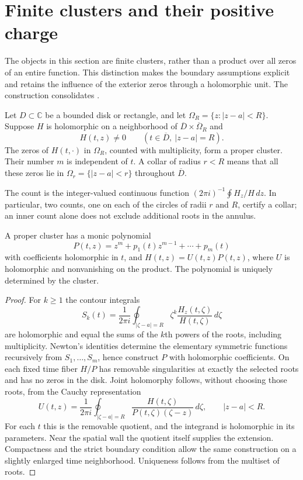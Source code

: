\section{Finite clusters and their positive charge}\label{f:cluster-section}

The objects in this section are finite clusters, rather than a product
over all zeros of an entire function.  This distinction makes the
boundary assumptions explicit and retains the influence of the exterior
zeros through a holomorphic unit.  The construction consolidates
\cite{note04}.

\begin{definition}\label{f:proper}
Let $D\subset\mathbb C$ be a bounded disk or rectangle, and let
$\Omega_R=\{z:|z-a|<R\}$.  Suppose $H$ is holomorphic on a neighborhood
of $\overline D\times\overline\Omega_R$ and
\[
 H(t,z)\ne0\qquad
 (t\in\overline D,\ |z-a|=R).
\]
The zeros of $H(t,\cdot)$ in $\Omega_R$, counted with multiplicity,
form a proper cluster.  Their number $m$ is independent of $t$.
A collar of radius $r<R$ means that all these zeros lie in
$\Omega_r=\{|z-a|<r\}$ throughout $\overline D$.
\end{definition}

The count is the integer-valued continuous function
$(2\pi i)^{-1}\oint H_z/H\,dz$.  In particular, two counts, one on each
of the circles of radii $r$ and $R$, certify a collar; an inner count
alone does not exclude additional roots in the annulus.

\begin{lemma}\label{f:preparation}\label{f:cluster}
A proper cluster has a monic polynomial
\[
 P(t,z)=z^m+p_1(t)z^{m-1}+\cdots+p_m(t)
\]
with coefficients holomorphic in $t$, and
$H(t,z)=U(t,z)P(t,z)$, where $U$ is holomorphic and nonvanishing on
the product.  The polynomial is uniquely determined by the cluster.
\end{lemma}

\begin{proof}
For $k\ge1$ the contour integrals
\begin{equation}\label{f:root-moments}
 S_k(t)=\frac1{2\pi i}\oint_{|\zeta-a|=R}
       \zeta^k\frac{H_z(t,\zeta)}{H(t,\zeta)}\,d\zeta
\end{equation}
are holomorphic and equal the sums of the $k$th powers of the roots,
including multiplicity.  Newton's identities determine the elementary
symmetric functions recursively from $S_1,\ldots,S_m$, hence construct
$P$ with holomorphic coefficients.  On each fixed time fiber $H/P$
has removable singularities at exactly the selected roots and has no
zeros in the disk.  Joint holomorphy follows, without choosing those
roots, from the Cauchy representation
\[
 U(t,z)=\frac1{2\pi i}\oint_{|\zeta-a|=R}
        \frac{H(t,\zeta)}{P(t,\zeta)(\zeta-z)}\,d\zeta,
       \qquad |z-a|<R.
\]
For each $t$ this is the removable quotient, and the integrand is
holomorphic in its parameters.  Near the spatial wall the quotient
itself supplies the extension.  Compactness and the strict boundary
condition allow the same construction on a slightly enlarged time
neighborhood.  Uniqueness follows from the multiset of roots.
\end{proof}

